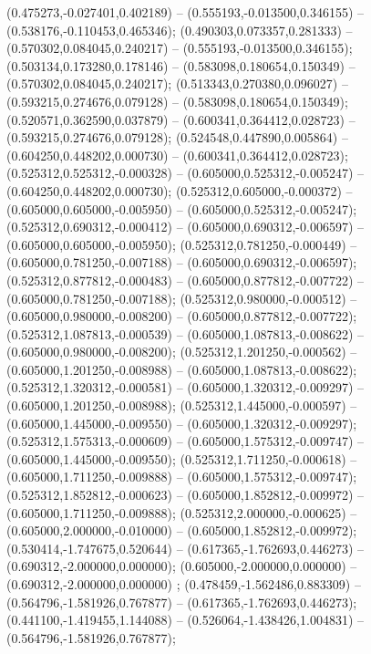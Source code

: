  (0.475273,-0.027401,0.402189) -- (0.555193,-0.013500,0.346155) -- (0.538176,-0.110453,0.465346);
 (0.490303,0.073357,0.281333) -- (0.570302,0.084045,0.240217) -- (0.555193,-0.013500,0.346155);
 (0.503134,0.173280,0.178146) -- (0.583098,0.180654,0.150349) -- (0.570302,0.084045,0.240217);
 (0.513343,0.270380,0.096027) -- (0.593215,0.274676,0.079128) -- (0.583098,0.180654,0.150349);
 (0.520571,0.362590,0.037879) -- (0.600341,0.364412,0.028723) -- (0.593215,0.274676,0.079128);
 (0.524548,0.447890,0.005864) -- (0.604250,0.448202,0.000730) -- (0.600341,0.364412,0.028723);
 (0.525312,0.525312,-0.000328) -- (0.605000,0.525312,-0.005247) -- (0.604250,0.448202,0.000730);
 (0.525312,0.605000,-0.000372) -- (0.605000,0.605000,-0.005950) -- (0.605000,0.525312,-0.005247);
 (0.525312,0.690312,-0.000412) -- (0.605000,0.690312,-0.006597) -- (0.605000,0.605000,-0.005950);
 (0.525312,0.781250,-0.000449) -- (0.605000,0.781250,-0.007188) -- (0.605000,0.690312,-0.006597);
 (0.525312,0.877812,-0.000483) -- (0.605000,0.877812,-0.007722) -- (0.605000,0.781250,-0.007188);
 (0.525312,0.980000,-0.000512) -- (0.605000,0.980000,-0.008200) -- (0.605000,0.877812,-0.007722);
 (0.525312,1.087813,-0.000539) -- (0.605000,1.087813,-0.008622) -- (0.605000,0.980000,-0.008200);
 (0.525312,1.201250,-0.000562) -- (0.605000,1.201250,-0.008988) -- (0.605000,1.087813,-0.008622);
 (0.525312,1.320312,-0.000581) -- (0.605000,1.320312,-0.009297) -- (0.605000,1.201250,-0.008988);
 (0.525312,1.445000,-0.000597) -- (0.605000,1.445000,-0.009550) -- (0.605000,1.320312,-0.009297);
 (0.525312,1.575313,-0.000609) -- (0.605000,1.575312,-0.009747) -- (0.605000,1.445000,-0.009550);
 (0.525312,1.711250,-0.000618) -- (0.605000,1.711250,-0.009888) -- (0.605000,1.575312,-0.009747);
 (0.525312,1.852812,-0.000623) -- (0.605000,1.852812,-0.009972) -- (0.605000,1.711250,-0.009888);
 (0.525312,2.000000,-0.000625) -- (0.605000,2.000000,-0.010000) -- (0.605000,1.852812,-0.009972);
 (0.530414,-1.747675,0.520644) -- (0.617365,-1.762693,0.446273) -- (0.690312,-2.000000,0.000000);
 (0.605000,-2.000000,0.000000) -- (0.690312,-2.000000,0.000000) ;
 (0.478459,-1.562486,0.883309) -- (0.564796,-1.581926,0.767877) -- (0.617365,-1.762693,0.446273);
 (0.441100,-1.419455,1.144088) -- (0.526064,-1.438426,1.004831) -- (0.564796,-1.581926,0.767877);

